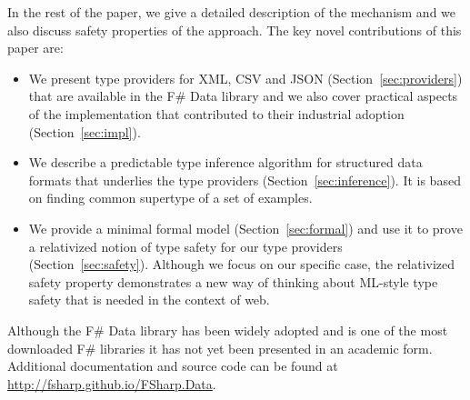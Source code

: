 \documentclass[preprint]{sigplanconf}
\begin{document}
In the rest of the paper, we give a detailed description of the mechanism and we also discuss
safety properties of the approach. The key novel contributions of this paper are:

\begin{itemize}
\item We present type providers for XML, CSV and JSON (Section~\ref{sec:providers}) 
  that are available in the F\# Data library and we also cover practical aspects of the 
  implementation that contributed to their industrial adoption (Section~\ref{sec:impl}). 

\item We describe a predictable type inference algorithm for structured data formats that
  underlies the type providers (Section~\ref{sec:inference}). It is based on finding common 
  supertype of a set of examples.

\item We provide a minimal formal model (Section~\ref{sec:formal}) and use it to prove a
  relativized notion of type safety for our type providers (Section~\ref{sec:safety}). Although 
  we focus on our specific case, the relativized safety property demonstrates a new way of 
  thinking about ML-style type safety that is needed in the context of web.
\end{itemize}

\noindent
Although the F\# Data library \cite{fsharp-data} has been widely adopted and is one of the most downloaded F\# libraries 
it has not yet been presented in an academic form. Additional documentation and source code can 
be found at \url{http://fsharp.github.io/FSharp.Data}.



%
%
\end{document}
